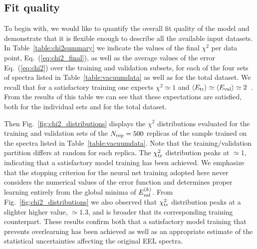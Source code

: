 \subsection{Fit quality}
%
To begin with, we would like to quantify the overall fit quality of the model and demonstrate that it is flexible enough
to describe all the available input datasets.
%
In Table~\ref{table:chi2summary} we indicate the values of the final $\chi^2$ per data point,
    Eq.~(\ref{eq:chi2_final}), as well as the average values of the error Eq.~(\ref{eq:chi2})
    over the training and validation subsets, for each of the four sets of spectra listed in
    Table~\ref{table:vacuumdata} as well as for the total dataset.
    We recall that for a satisfactory training one expects $\chi^2 \simeq 1$
    and $\left\langle E_{\rm tr}\right\rangle \simeq \left\langle E_{\rm val}\right\rangle \simeq 2 $~\cite{Forte:2002fg}.
    From the results of this table we can see that these expectations are satisfied,
    both for the individual sets and for the total dataset.

    Then Fig.~\ref{fig:chi2_distributions} displays  the $\chi^2$  distributions
    evaluated for the training and validation sets
      of the $N_{\rm rep}=500$ replicas of the sample trained on the spectra
      listed in Table~\ref{table:vacuumdata}.
      Note that the training/validation partition differs at random for each replica.
      The $\chi^2_{\rm tr}$ distribution peaks at $\simeq 1$, indicating that a satisfactory model training
      has been achieved.
      We emphasize that the stopping criterion for the neural net training adopted here never considers
      the numerical values of the error function and determines proper learning entirely from
      the global minima of $E_{\rm val}^{(k)}$.
      From Fig.~\ref{fig:chi2_distributions}  we also observed that  $\chi^2_{\rm tr}$ distribution peaks at
      a slighter higher value, $\simeq 1.3$, and is broader that its corresponding training counterpart.
      These results confirm both that a satisfactory model training that prevents overlearning
      has been achieved as well as an appropriate estimate of the statistical uncertainties
      affecting the original EEL spectra.
    
